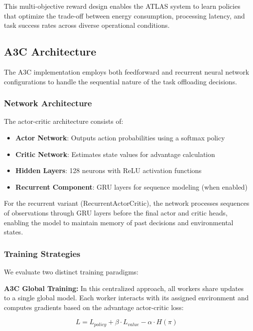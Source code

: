 \documentclass[journal]{IEEEtran}
\begin{document}
This multi-objective reward design enables the ATLAS system to learn policies that optimize the trade-off between energy consumption, processing latency, and task success rates across diverse operational conditions.

\subsection{A3C Architecture}

The A3C implementation employs both feedforward and recurrent neural network configurations to handle the sequential nature of the task offloading decisions.

\subsubsection{Network Architecture}

The actor-critic architecture consists of:
\begin{itemize}
\item \textbf{Actor Network}: Outputs action probabilities using a softmax policy
\item \textbf{Critic Network}: Estimates state values for advantage calculation
\item \textbf{Hidden Layers}: 128 neurons with ReLU activation functions
\item \textbf{Recurrent Component}: GRU layers for sequence modeling (when enabled)
\end{itemize}

For the recurrent variant (RecurrentActorCritic), the network processes sequences of observations through GRU layers before the final actor and critic heads, enabling the model to maintain memory of past decisions and environmental states.

\subsubsection{Training Strategies}

We evaluate two distinct training paradigms:

\textbf{A3C Global Training:} In this centralized approach, all workers share updates to a single global model. Each worker interacts with its assigned environment and computes gradients based on the advantage actor-critic loss:

\begin{equation}
L = L_{policy} + \beta \cdot L_{value} - \alpha \cdot H(\pi)
\end{equation}
\end{document}
